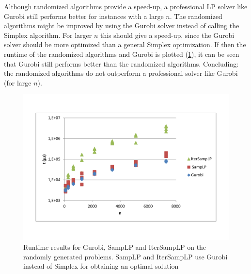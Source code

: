 \documentclass[nocopyrightspace]{acm_proc_article-sp}
\begin{document}
Although randomized algorithms provide a speed-up, a professional LP solver like Gurobi still performs better for instances with a large $n$. The randomized algorithms might be improved by using the Gurobi solver instead of calling the Simplex algorithm. For larger $n$ this should give a speed-up, since the Gurobi solver should be more optimized than a general Simplex optimization. If then the runtime of the randomized algorithms and Gurobi is plotted (\ref{fig:gurobiruntime}), it can be seen that Gurobi still performs better than the randomized algorithms. Concluding: the randomized algorithms do not outperform a professional solver like Gurobi (for large $n$). 

\begin{figure}[h!]
\includegraphics[width=\columnwidth]{../Results/gurobi_runtime.pdf}
\caption{Runtime results for Gurobi, SampLP and IterSampLP on the randomly generated problems. SampLP and IterSampLP use Gurobi instead of Simplex for obtaining an optimal solution}
\label{fig:gurobiruntime}
\end{figure}
\end{document}
